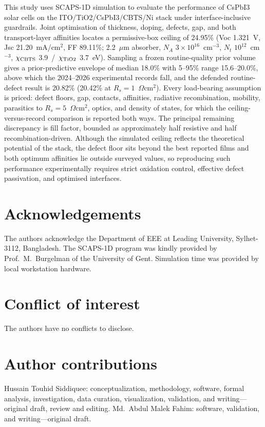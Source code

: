 \documentclass[11pt,a4paper]{article}
\begin{document}
This study uses SCAPS-1D simulation to evaluate the performance of CsPbI3 solar cells on the ITO/TiO2/CsPbI3/CBTS/Ni stack under interface-inclusive guardrails. Joint optimisation of thickness, doping, defects, gap, and both transport-layer affinities locates a permissive-box ceiling of 24.95\% (Voc 1.321~V, Jsc 21.20~mA/cm$^2$, FF 89.11\%; 2.2~$\mu$m absorber, $N_A$ $3\times10^{16}$~cm$^{-3}$, $N_t$ $10^{12}$~cm$^{-3}$, $\chi_{\rm CBTS}$ 3.9~/~$\chi_{\rm TiO2}$ 3.7~eV). Sampling a frozen routine-quality prior volume gives a prior-predictive envelope of median 18.0\% with 5--95\% range 15.6--20.0\%, above which the 2024--2026 experimental records fall, and the defended routine-defect result is 20.82\% (20.42\% at $R_s=1$~$\Omega$cm$^2$). Every load-bearing assumption is priced: defect floors, gap, contacts, affinities, radiative recombination, mobility, parasitics to $R_s=5$~$\Omega$cm$^2$, optics, and density of states, for which the ceiling-versus-record comparison is reported both ways. The principal remaining discrepancy is fill factor, bounded as approximately half resistive and half recombination-driven. Although the simulated ceiling reflects the theoretical potential of the stack, the defect floor sits beyond the best reported films and both optimum affinities lie outside surveyed values, so reproducing such performance experimentally requires strict oxidation control, effective defect passivation, and optimised interfaces.

\section*{Acknowledgements}

The authors acknowledge the Department of EEE at Leading University, Sylhet-3112, Bangladesh. The SCAPS-1D program was kindly provided by Prof.~M.~Burgelman of the University of Gent. Simulation time was provided by local workstation hardware.

\section*{Conflict of interest}

The authors have no conflicts to disclose.

\section*{Author contributions}

Hussain Touhid Siddiquee: conceptualization, methodology, software, formal analysis, investigation, data curation, visualization, validation, and writing---original draft, review and editing. Md.\ Abdul Malek Fahim: software, validation, and writing---original draft.
\end{document}
